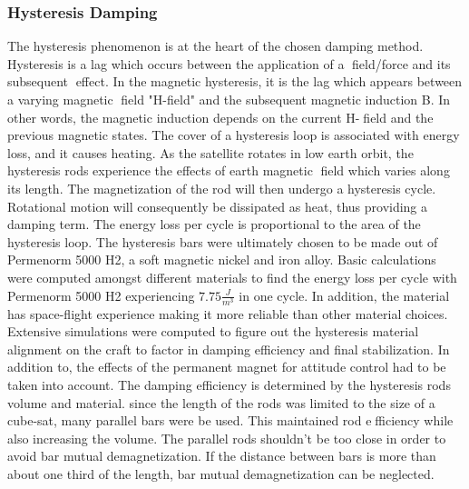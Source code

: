 \documentclass[12pt]{article}
\begin{document}
\subsubsection{Hysteresis Damping}
The hysteresis phenomenon is at the heart of the chosen damping method. Hysteresis is a lag which occurs between the application of a field/force and its subsequent effect. In the magnetic hysteresis, it is the lag which appears between a varying magnetic field "H-field" and the subsequent magnetic induction B. In other words, the magnetic induction depends on the current H-field and the previous magnetic states. The cover of a hysteresis loop is associated with energy loss, and it causes heating. As the satellite rotates in low earth orbit, the hysteresis rods experience the effects of earth magnetic field which varies along its length. The magnetization of the rod will then undergo a hysteresis cycle. Rotational motion will consequently be dissipated as heat, thus providing a  damping term. The energy loss per cycle is proportional to the area of the hysteresis loop.
\newline \newline
The hysteresis bars were ultimately chosen to be made out of Permenorm 5000 H2, a soft magnetic nickel and iron alloy. Basic calculations were computed amongst different materials to find the energy loss per cycle with Permenorm 5000 H2 experiencing $7.75 \frac{J}{m^3}$ in one cycle. In addition, the material has space-flight experience making it more reliable than other material choices. 
\newline \newline
Extensive simulations were computed to figure out the hysteresis material alignment on the craft to factor in damping efficiency and final stabilization. In addition to, the effects of the permanent magnet for attitude control had to be taken into account. The damping efficiency is determined by the hysteresis rods volume and material. since the length of the rods was limited to the size of a cube-sat, many parallel bars were be used. This maintained rod efficiency while also increasing the volume. The parallel rods shouldn't be too close in order to avoid bar mutual demagnetization. If the distance between bars is more than about one third of the length, bar mutual demagnetization can be neglected.
\end{document}
